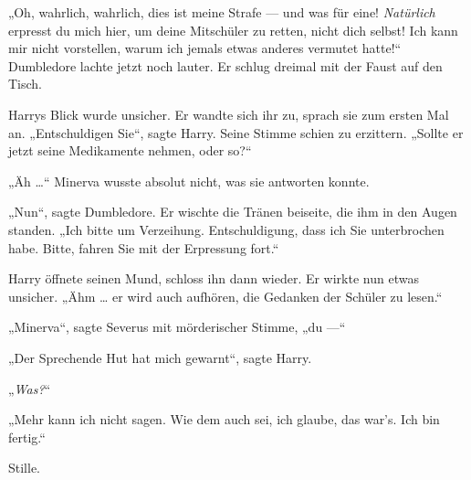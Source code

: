 „Oh, wahrlich, wahrlich, dies ist meine Strafe — und was für eine! \emph{Natürlich} erpresst du mich hier, um deine Mitschüler zu retten, nicht dich selbst! Ich kann mir nicht vorstellen, warum ich jemals etwas anderes vermutet hatte!“ Dumbledore lachte jetzt noch lauter. Er schlug dreimal mit der Faust auf den Tisch.

Harrys Blick wurde unsicher. Er wandte sich ihr zu, sprach sie zum ersten Mal an.
„Entschuldigen Sie“, sagte Harry. Seine Stimme schien zu erzittern.
„Sollte er jetzt seine Medikamente nehmen, oder so?“

„Äh …“ Minerva wusste absolut nicht, was sie antworten konnte.

„Nun“, sagte Dumbledore. Er wischte die Tränen beiseite, die ihm in den Augen standen.
„Ich bitte um Verzeihung. Entschuldigung, dass ich Sie unterbrochen habe. Bitte, fahren Sie mit der Erpressung fort.“

Harry öffnete seinen Mund, schloss ihn dann wieder. Er wirkte nun etwas unsicher. „Ähm … er wird auch aufhören, die Gedanken der Schüler zu lesen.“

„Minerva“, sagte Severus mit mörderischer Stimme, „du —“

„Der Sprechende Hut hat mich gewarnt“, sagte Harry.

„\emph{Was?}“

„Mehr kann ich nicht sagen. Wie dem auch sei, ich glaube, das war’s. Ich bin fertig.“

Stille.

